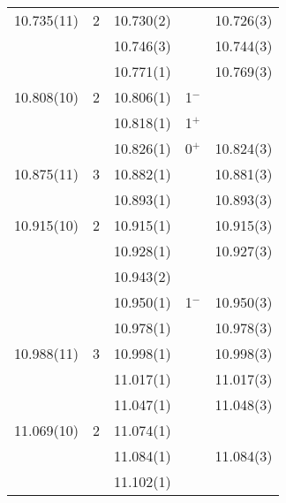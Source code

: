 \begin{center}
\begin{longtable}{cc cc c}
     10.735(11)        & 2        & 10.730(2)   &                               &    10.726(3)  \\
                       &          & 10.746(3)   &                               &    10.744(3)  \\
                       &          & 10.771(1)   &                               &    10.769(3)  \\
     10.808(10)        & 2        & 10.806(1)   &            1$^-$              &               \\
                       &          & 10.818(1)   &            1$^+$              &               \\
                       &          & 10.826(1)   &            0$^+$              &    10.824(3)  \\
     10.875(11)        & 3        & 10.882(1)   &                               &    10.881(3)  \\
                       &          & 10.893(1)   &                               &    10.893(3)  \\
     10.915(10)        & 2        & 10.915(1)   &                               &    10.915(3)  \\
                       &          & 10.928(1)   &                               &    10.927(3)  \\
                       &          & 10.943(2)   &                               &               \\
                       &          & 10.950(1)   &            1$^-$              &    10.950(3)  \\
                       &          & 10.978(1)   &                               &    10.978(3)  \\
   10.988(11)          & 3        & 10.998(1)   &                               &    10.998(3)  \\
                       &          & 11.017(1)   &                               &    11.017(3)  \\
                       &          & 11.047(1)   &                               &    11.048(3)  \\
    11.069(10)         & 2        & 11.074(1)   &                               &               \\
                       &          & 11.084(1)   &                               &    11.084(3)  \\
                       &          & 11.102(1)   &                               &               \\

\end{longtable}
\end{center}
